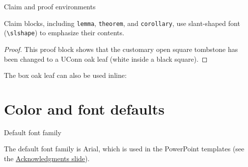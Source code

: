 \documentclass{beamer}
\begin{document}
\begin{frame}[fragile]{Claim and proof environments}

\begin{theorem}
Claim blocks, including \verb|lemma|, \verb|theorem|, and \verb|corollary|, use slant-shaped font (\verb|\slshape|) to emphasize their contents.
\end{theorem}

\begin{proof}
This proof block shows that the customary open square tombstone has been changed to a UConn oak leaf (white inside a black square).
\end{proof}

\begin{corollary}
The box oak leaf can also be used inline: \oakleafbox
\end{corollary}

\end{frame}


\section{Color and font defaults}


\begin{frame}{Default font family}

The default font family is Arial, which is used in the PowerPoint templates (see the \hyperlink{slide:acknowledgments}{Acknowledgments slide}).

\end{frame}
\end{document}
